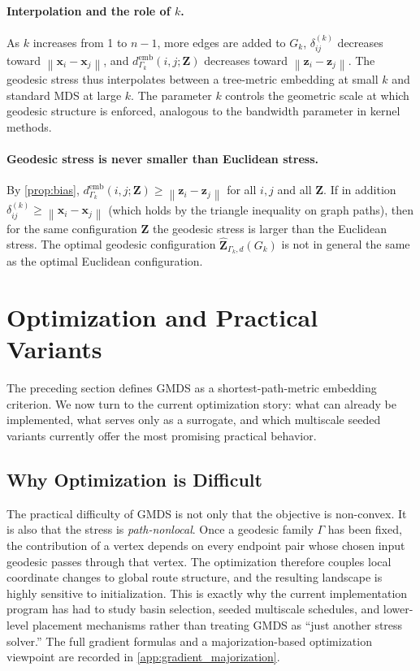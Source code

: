 \documentclass[11pt]{article}
\newcommand{\bx}{\mathbf{x}}
\newcommand{\bz}{\mathbf{z}}
\newcommand{\bZ}{\mathbf{Z}}
\newcommand{\norm}[1]{\left\|#1\right\|}
\newcommand{\demb}{d^{\mathrm{emb}}}
\newcommand{\Gk}{G_k}
\theoremstyle{definition}
\theoremstyle{plain}
\theoremstyle{remark}
\begin{document}
\paragraph{Interpolation and the role of $k$.}
As $k$ increases from 1 to $n-1$, more edges are added to $\Gk$,
$\delta^{(k)}_{ij}$ decreases toward $\norm{\bx_i - \bx_j}$, and
$\demb_{\Gamma_k}(i,j;\bZ)$ decreases toward $\norm{\bz_i - \bz_j}$.  The
geodesic stress thus interpolates between a tree-metric embedding at small
$k$ and standard MDS at large $k$.  The parameter $k$ controls the
geometric scale at which geodesic structure is enforced, analogous to the
bandwidth parameter in kernel methods.

\paragraph{Geodesic stress is never smaller than Euclidean stress.}
By \cref{prop:bias}, $\demb_{\Gamma_k}(i,j;\bZ) \geq \norm{\bz_i - \bz_j}$
for all $i,j$ and all $\bZ$.  If in addition $\delta^{(k)}_{ij} \geq
\norm{\bx_i - \bx_j}$ (which holds by the triangle inequality on graph
paths), then for the same configuration $\bZ$ the geodesic stress is
larger than the Euclidean stress.  The optimal geodesic configuration
$\hat{\bZ}_{\Gamma_k,d}(\Gk)$ is not in general the same as the optimal
Euclidean configuration.

\section{Optimization and Practical Variants}
\label{sec:optimization_v4}

The preceding section defines GMDS as a shortest-path-metric embedding
criterion.  We now turn to the current optimization story: what can already be
implemented, what serves only as a surrogate, and which multiscale seeded
variants currently offer the most promising practical behavior.

\subsection{Why Optimization is Difficult}
\label{sec:gradient}

The practical difficulty of GMDS is not only that the objective is non-convex.
It is also that the stress is \emph{path-nonlocal}.  Once a geodesic family
$\Gamma$ has been fixed, the contribution of a vertex depends on every endpoint
pair whose chosen input geodesic passes through that vertex.  The optimization
therefore couples local coordinate changes to global route structure, and the
resulting landscape is highly sensitive to initialization.  This is exactly why
the current implementation program has had to study basin selection, seeded
multiscale schedules, and lower-level placement mechanisms rather than treating
GMDS as ``just another stress solver.''  The full gradient formulas and a
majorization-based optimization viewpoint are recorded in
\cref{app:gradient_majorization}.
\end{document}

